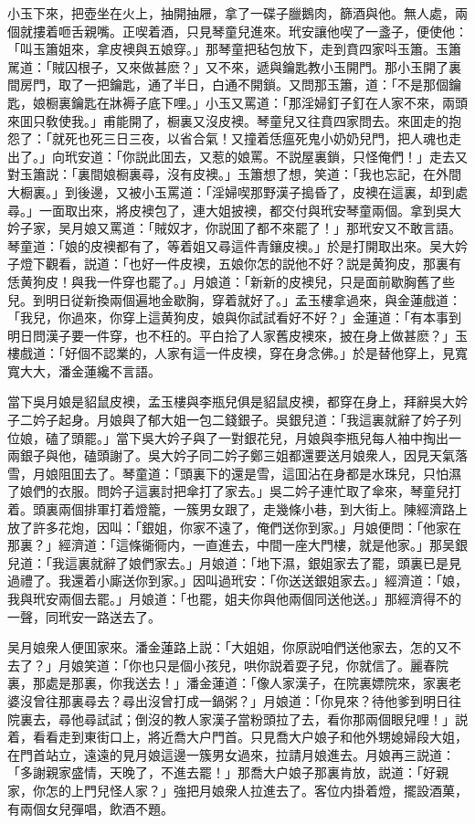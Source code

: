 小玉下來，把壺坐在火上，抽開抽屜，拿了一碟子臘鵝肉，篩酒與他。無人處，兩個就摟着咂舌親嘴。正喫着酒，只見琴童兒進來。玳安讓他喫了一盞子，便使他：「叫玉簫姐來，拿皮襖與五娘穿。」那琴童把毡包放下，走到賁四家呌玉簫。玉簫駡道：「賊囚根子，又來做甚麽？」又不來，遞與鑰匙教小玉開門。那小玉開了裏間房門，取了一把鑰匙，通了半日，白通不開鎖。又問那玉簫，道：「不是那個鑰匙，娘橱裏鑰匙在牀褥子底下哩。」小玉又罵道：「那淫婦釘子釘在人家不來，兩頭來囬只敎使我。」甫能開了，橱裏又沒皮襖。琴童兒又往賁四家問去。來囬走的抱怨了：「就死也死三日三夜，以省合氣！又撞着恁瘟死鬼小奶奶兒門，把人魂也走出了。」向玳安道：「你説此囬去，又惹的娘罵。不説屋裏鎖，只怪俺們！」走去又對玉簫説：「裏間娘橱裏尋，沒有皮襖。」玉簫想了想，笑道：「我也忘記，在外間大橱裏。」到後邊，又被小玉罵道：「淫婦喫那野漢子搗昏了，皮襖在這裏，却到處尋。」一面取出來，將皮襖包了，連大姐披襖，都交付與玳安琴童兩個。拿到吳大妗子家，吴月娘又罵道：「賊奴才，你説囬了都不來罷了！」那玳安又不敢言語。琴童道：「娘的皮襖都有了，等着姐又尋這件青鑲皮襖。」於是打開取出來。吴大妗子燈下觀看，説道：「也好一件皮襖，五娘你怎的説他不好？説是黄狗皮，那裏有恁黄狗皮！與我一件穿也罷了。」月娘道：「新新的皮襖兒，只是面前歇胸舊了些兒。到明日従新換兩個遍地金歇胸，穿着就好了。」孟玉樓拿過來，與金蓮戲道：「我兒，你過來，你穿上這黄狗皮，娘與你試試看好不好？」金蓮道：「有本事到明日問漢子要一件穿，也不枉的。平白拾了人家舊皮襖來，披在身上做甚麽？」玉樓戲道：「好個不認業的，人家有這一件皮襖，穿在身念佛。」於是替他穿上，見寬寬大大，潘金蓮纔不言語。

當下吳月娘是貂鼠皮襖，孟玉樓與李瓶兒俱是貂鼠皮襖，都穿在身上，拜辭吳大妗子二妗子起身。月娘與了郁大姐一包二錢銀子。吳銀兒道：「我這裏就辭了妗子列位娘，磕了頭罷。」當下吳大妗子與了一對銀花兒，月娘與李瓶兒每人袖中掏出一兩銀子與他，磕頭謝了。吳大妗子同二妗子鄭三姐都還要送月娘衆人，因見天氣落雪，月娘阻囬去了。琴童道：「頭裏下的還是雪，這囬沾在身都是水珠兒，只怕濕了娘們的衣服。問妗子這裏討把傘打了家去。」吳二妗子連忙取了傘來，琴童兒打着。頭裏兩個排軍打着燈籠，一簇男女跟了，走幾條小巷，到大街上。陳經濟路上放了許多花炮，因叫：「銀姐，你家不遠了，俺們送你到家。」月娘便問：「他家在那裏？」經濟道：「這條衚衕内，一直進去，中間一座大門樓，就是他家。」那吴銀兒道：「我這裏就辭了娘們家去。」月娘道：「地下濕，銀姐家去了罷，頭裏已是見過禮了。我還着小廝送你到家。」因叫過玳安：「你送送銀姐家去。」經濟道：「娘，我與玳安兩個去罷。」月娘道：「也罷，姐夫你與他兩個同送他送。」那經濟得不的一聲，同玳安一路送去了。

吴月娘衆人便囬家來。潘金蓮路上説：「大姐姐，你原説咱們送他家去，怎的又不去了？」月娘笑道：「你也只是個小孩兒，哄你説着耍子兒，你就信了。麗春院裏，那處是那裏，你我送去！」潘金蓮道：「像人家漢子，在院裏嫖院來，家裏老婆沒曾往那裏尋去？尋出沒曾打成一鍋粥？」月娘道：「你見來？待他爹到明日往院裏去，尋他尋試試；倒沒的教人家漢子當粉頭拉了去，看你那兩個眼兒哩！」説着，看看走到東街口上，將近喬大户門首。只見喬大户娘子和他外甥媳婦段大姐，在門首站立，遠遠的見月娘這邊一簇男女過來，拉請月娘進去。月娘再三説道：「多謝親家盛情，天晚了，不進去罷！」那喬大户娘子那裏肯放，説道：「好親家，你怎的上門兒怪人家？」強把月娘衆人拉進去了。客位内掛着燈，擺設酒菓，有兩個女兒彈唱，飲酒不題。

